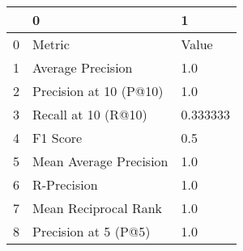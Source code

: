 \begin{tabular}{lll}
\toprule
{} &                       0 &         1 \\
\midrule
0 &                  Metric &     Value \\
1 &       Average Precision &       1.0 \\
2 &  Precision at 10 (P@10) &       1.0 \\
3 &     Recall at 10 (R@10) &  0.333333 \\
4 &                F1 Score &       0.5 \\
5 &  Mean Average Precision &       1.0 \\
6 &             R-Precision &       1.0 \\
7 &    Mean Reciprocal Rank &       1.0 \\
8 &    Precision at 5 (P@5) &       1.0 \\
\bottomrule
\end{tabular}
